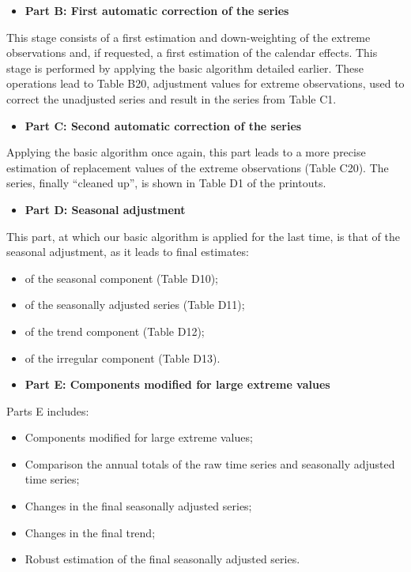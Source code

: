 \documentclass[
  letterpaper,
  DIV=11,
  numbers=noendperiod]{scrreprt}
\providecommand{\tightlist}{%
  \setlength{\itemsep}{0pt}\setlength{\parskip}{0pt}}\usepackage{longtable,booktabs,array}
\begin{document}
\begin{itemize}
\tightlist
\item
  \textbf{Part B: First automatic correction of the series}
\end{itemize}

This stage consists of a first estimation and down-weighting of the
extreme observations and, if requested, a first estimation of the
calendar effects. This stage is performed by applying the basic
algorithm detailed earlier. These operations lead to Table B20,
adjustment values for extreme observations, used to correct the
unadjusted series and result in the series from Table C1.

\begin{itemize}
\tightlist
\item
  \textbf{Part C: Second automatic correction of the series}
\end{itemize}

Applying the basic algorithm once again, this part leads to a more
precise estimation of replacement values of the extreme observations
(Table C20). The series, finally ``cleaned up'', is shown in Table D1 of
the printouts.

\begin{itemize}
\tightlist
\item
  \textbf{Part D: Seasonal adjustment}
\end{itemize}

This part, at which our basic algorithm is applied for the last time, is
that of the seasonal adjustment, as it leads to final estimates:

\begin{itemize}
\item
  of the seasonal component (Table D10);
\item
  of the seasonally adjusted series (Table D11);
\item
  of the trend component (Table D12);
\item
  of the irregular component (Table D13).
\end{itemize}

\begin{itemize}
\tightlist
\item
  \textbf{Part E: Components modified for large extreme values}
\end{itemize}

Parts E includes:

\begin{itemize}
\item
  Components modified for large extreme values;
\item
  Comparison the annual totals of the raw time series and seasonally
  adjusted time series;
\item
  Changes in the final seasonally adjusted series;
\item
  Changes in the final trend;
\item
  Robust estimation of the final seasonally adjusted series.
\end{itemize}
\end{document}
